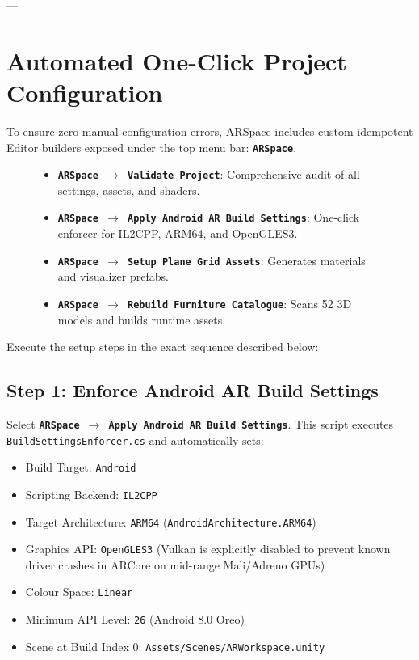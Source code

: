 \documentclass[11pt,a4paper]{article}
\begin{document}
---

\section{Automated One-Click Project Configuration}
To ensure zero manual configuration errors, ARSpace includes custom idempotent Editor builders exposed under the top menu bar: \textbf{\texttt{ARSpace}}.

\begin{figure}[h!]
\centering
\begin{tcolorbox}[colback=white,colframe=primaryblue,title=\textbf{The ARSpace Editor Menu Hierarchy},arc=2mm]
\begin{itemize}[leftmargin=1.5em]
    \item \textbf{\texttt{ARSpace $\rightarrow$ Validate Project}}: Comprehensive audit of all settings, assets, and shaders.
    \item \textbf{\texttt{ARSpace $\rightarrow$ Apply Android AR Build Settings}}: One-click enforcer for IL2CPP, ARM64, and OpenGLES3.
    \item \textbf{\texttt{ARSpace $\rightarrow$ Setup Plane Grid Assets}}: Generates materials and visualizer prefabs.
    \item \textbf{\texttt{ARSpace $\rightarrow$ Rebuild Furniture Catalogue}}: Scans 52 3D models and builds runtime assets.
\end{itemize}
\end{tcolorbox}
\end{figure}

Execute the setup steps in the exact sequence described below:

\subsection{Step 1: Enforce Android AR Build Settings}
Select \textbf{\texttt{ARSpace $\rightarrow$ Apply Android AR Build Settings}}.
This script executes \texttt{BuildSettingsEnforcer.cs} and automatically sets:
\begin{itemize}[noitemsep]
    \item Build Target: \texttt{Android}
    \item Scripting Backend: \texttt{IL2CPP}
    \item Target Architecture: \texttt{ARM64} (\texttt{AndroidArchitecture.ARM64})
    \item Graphics API: \texttt{OpenGLES3} (Vulkan is explicitly disabled to prevent known driver crashes in ARCore on mid-range Mali/Adreno GPUs)
    \item Colour Space: \texttt{Linear}
    \item Minimum API Level: \texttt{26} (Android 8.0 Oreo)
    \item Scene at Build Index 0: \texttt{Assets/Scenes/ARWorkspace.unity}
\end{itemize}
\end{document}
